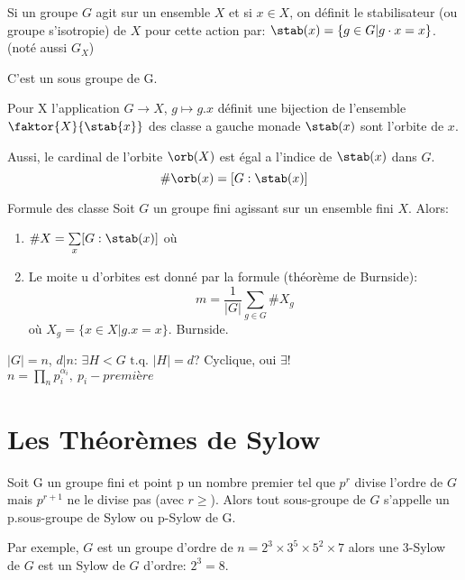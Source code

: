 \begin{definition}
	Si un groupe $G$ agit sur un ensemble $X$ et si $x\in X$, on définit le stabilisateur (ou groupe s'isotropie) de $X$ pour cette action par: $\stab(x)=\{g\in G | g\cdot x=x\}$. (noté aussi $G_X$)
\end{definition}

\begin{proposition}
	C'est un sous groupe de G. %
\end{proposition}

\begin{proposition} 
	Pour X l'application $G\rightarrow X$, $g\mapsto g.x$ définit une bijection de l'ensemble $\faktor{X}{\stab{x}}$ des classe a gauche monade $\stab(x)$ sont l'orbite de $x$.
\end{proposition}

Aussi, le cardinal de l'orbite $\orb(X)$ est égal a l'indice de $\stab(x)$ dans $G$.
$$\#\orb(x) =[G: \stab(x)]$$

\begin{theorem}{Formule des classe}
	Soit $G$ un groupe fini agissant sur un ensemble fini $X$. Alors:
	\begin{enumerate}
		\item $\#X=\sum\limits_x[G: \stab(x)]$ où 
		\item Le moite u d'orbites est donné par la formule (théorème de Burnside):
		$$m=\frac{1}{|G|}\sum\limits_{g\in G}\#X_g$$
		où $X_g=\{x\in X | g.x=x\}$. Burnside.
	\end{enumerate}
\end{theorem}

\begin{remark}
	$|G|=n$, $d | n$: $\exists H<G \text{ t.q. } |H|=d$? Cyclique, oui $\exists !$\\
	$n=\prod\limits_n p_i^{\alpha_i},\ p_i - première$
\end{remark}

\section{Les Théorèmes de Sylow}

Soit G un groupe fini et point p un nombre premier tel que $p^r$ divise l'ordre de $G$ mais $p^{r+1}$ ne le divise pas (avec $r\geq$).
Alors tout sous-groupe de $G$ s'appelle un p.sous-groupe de Sylow ou p-Sylow de G.

Par exemple, $G$ est un groupe d'ordre de $n=2^3\times 3^5\times 5^2 \times 7$
alors une 3-Sylow de $G$ est un Sylow de $G$ d'ordre: $2^3=8$.

